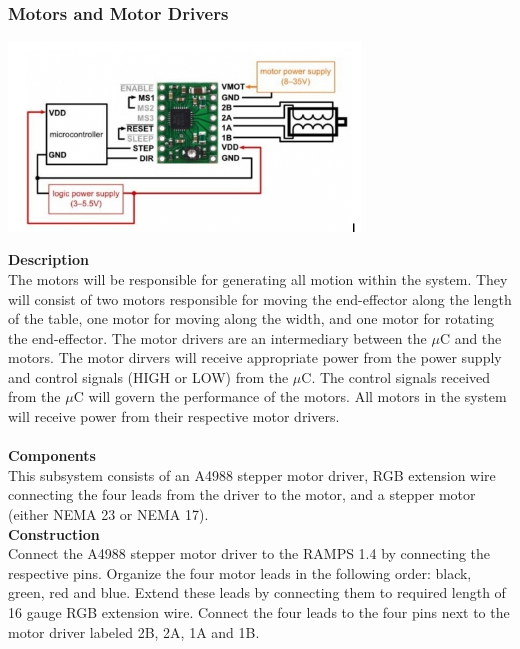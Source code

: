 \documentclass[titlepage]{article}
\begin{document}
\subsubsection{Motors and Motor Drivers}
\begin{center}
	\includegraphics[width = 0.7\textwidth]{Motors.png}
\label{fig:MotorsFig}
\end{center}
\textbf{Description}\\
The motors will be responsible for generating all motion within the system. They will consist of two motors responsible for moving the end-effector along the length of the table, one motor for moving along the width, and one motor for rotating the end-effector. The motor drivers are an intermediary between the $\mu$C and the motors. The motor dirvers will receive appropriate power from the power supply and control signals (HIGH or LOW) from the $\mu$C. The control signals received from the $\mu$C will govern the performance of the motors. All motors in the system will receive power from their respective motor drivers.\\\\
\textbf{Components}\\
This subsystem consists of an A4988 stepper motor driver, RGB extension wire connecting the four leads from the driver to the motor, and a stepper motor (either NEMA 23 or NEMA 17).\\
\textbf{Construction}\\
Connect the A4988 stepper motor driver to the RAMPS 1.4 by connecting the respective pins. Organize the four motor leads in the following order: black, green, red and blue. Extend these leads by connecting them to required length of 16 gauge RGB extension wire. Connect the four leads to the four pins next to the motor driver labeled 2B, 2A, 1A and 1B.
\end{document}
